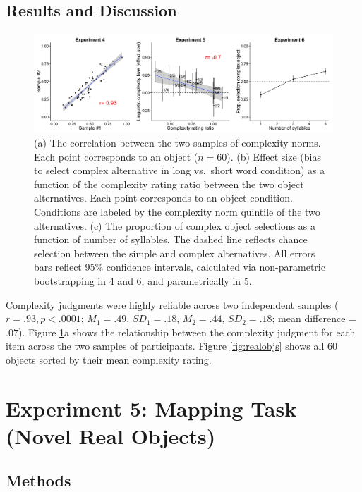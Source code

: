 \subsection{Results and Discussion}

 \begin{figure} [t]
 \begin{center}
  \includegraphics[width=6in]{figs/study2_plots.png}
  \caption{\label{fig:study2_plots} (a) The correlation between the two samples of complexity norms. Each point corresponds to an object ($n = 60$). (b) Effect size (bias to select complex alternative in long vs.\ short word condition) as a function of the complexity rating ratio between the two object alternatives. Each point corresponds to an object condition. Conditions are labeled by the complexity norm quintile of the two alternatives. (c) The proportion of complex object selections as a function of number of syllables. The dashed line reflects chance selection between the simple and complex alternatives. All errors bars reflect 95\% confidence intervals, calculated via non-parametric bootstrapping in 4 and 6, and parametrically in 5.}
 \end{center}
\end{figure}
 Complexity judgments were highly reliable across two independent samples ($r = .93, p < .0001$; $M_1 = .49$, $SD_1 = .18$, $M_2 = .44$, $SD_2 = .18$; mean difference = $.07$). Figure \ref{fig:study2_plots}a shows the relationship between the complexity judgment for each item across the two samples of participants. Figure \ref{fig:realobjs} shows all 60 objects sorted by their mean complexity rating.

\section{Experiment 5: Mapping Task (Novel Real Objects)}
\label{ch2-5}

\subsection{Methods}
